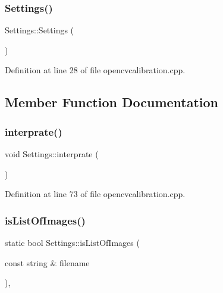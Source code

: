 \subsubsection{\texorpdfstring{Settings()}{Settings()}}
{\footnotesize\ttfamily Settings\+::\+Settings (\begin{DoxyParamCaption}{ }\end{DoxyParamCaption})\hspace{0.3cm}{\ttfamily [inline]}}



Definition at line 28 of file opencvcalibration.\+cpp.



\subsection{Member Function Documentation}
\mbox{\label{classSettings_ac01c17bf3536e296f1076e50cdcb00cd}} 
\subsubsection{\texorpdfstring{interprate()}{interprate()}}
{\footnotesize\ttfamily void Settings\+::interprate (\begin{DoxyParamCaption}{ }\end{DoxyParamCaption})\hspace{0.3cm}{\ttfamily [inline]}}



Definition at line 73 of file opencvcalibration.\+cpp.

\mbox{\label{classSettings_ae7696860215ac20c48a5e7121c5dd32e}} 
\subsubsection{\texorpdfstring{isListOfImages()}{isListOfImages()}}
{\footnotesize\ttfamily static bool Settings\+::is\+List\+Of\+Images (\begin{DoxyParamCaption}\item[{const string \&}]{filename }\end{DoxyParamCaption})\hspace{0.3cm}{\ttfamily [inline]}, {\ttfamily [static]}}



